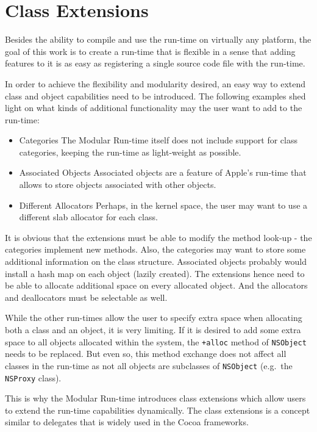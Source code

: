 \section{Class Extensions}

Besides the ability to compile and use the run-time on virtually any platform, the goal of this work is to create a run-time that is flexible in a sense that adding features to it is as easy as registering a single source code file with the run-time.

In order to achieve the flexibility and modularity desired, an easy way to extend class and object capabilities need to be introduced. The following examples shed light on what kinds of additional functionality may the user want to add to the run-time:

\begin{itemize}
  \item{Categories} The Modular Run-time itself does not include support for class categories, keeping the run-time as light-weight as possible.
  \item{Associated Objects} Associated objects are a feature of Apple's run-time that allows to store objects associated with other objects.
  \item{Different Allocators} Perhaps, in the kernel space, the user may want to use a different slab allocator for each class.
\end{itemize}

It is obvious that the extensions must be able to modify the method look-up - the categories implement new methods. Also, the categories may want to store some additional information on the class structure. Associated objects probably would install a hash map on each object (lazily created). The extensions hence need to be able to allocate additional space on every allocated object. And the allocators and deallocators must be selectable as well.

While the other run-times allow the user to specify extra space when allocating both a class and an object, it is very limiting. If it is desired to add some extra space to all objects allocated within the system, the \verb=+alloc= method of \verb=NSObject= needs to be replaced. But even so, this method exchange does not affect all classes in the run-time as not all objects are subclasses of \verb=NSObject= (e.g.\ the \verb=NSProxy= class).

This is why the Modular Run-time introduces class extensions which allow users to extend the run-time capabilities dynamically. The class extensions is a concept similar to delegates that is widely used in the Cocoa frameworks.

